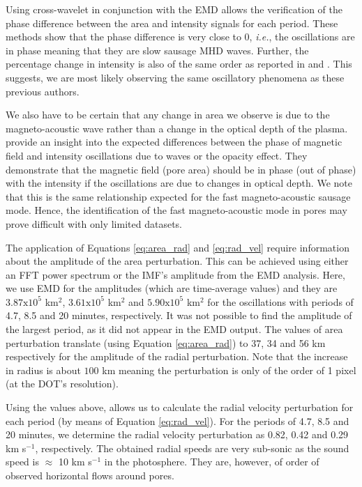     Using cross-wavelet in conjunction with the EMD allows the verification of the phase difference between the area and intensity signals for each period. 
    These methods show that the phase difference is very close to 0\degree, \textit{i.e.}, the oscillations are in phase meaning that they are slow sausage MHD waves.	
    Further, the percentage change in intensity is also of the same order as reported in \citet{Balthasar2000} and \citet{PMHDW}.
    This suggests, we are most likely observing the same oscillatory phenomena as these previous authors.
    
    We also have to be certain that any change in area we observe is due to the magneto-acoustic wave rather than a change in the optical depth of the plasma.
    \citet{PMHDW} provide an insight into the expected differences between the phase of magnetic field and intensity oscillations due to waves or the opacity effect.
    They demonstrate that the magnetic field (pore area) should be in phase (out of phase) with the intensity if the oscillations are due to changes in optical depth.
    We note that this is the same relationship expected for the fast magneto-acoustic sausage mode.
    Hence, the identification of the fast magneto-acoustic mode in pores may prove difficult with only limited datasets.
    
    The application of Equations \ref{eq:area_rad} and \ref{eq:rad_vel} require information about the amplitude of the area perturbation.
    This can be achieved using either an FFT power spectrum or the IMF's amplitude from the EMD analysis.
    Here, we use EMD for the amplitudes (which are time-average values) and they are $3.87\mathrm{x}10^5$ km$^2$, $3.61\mathrm{x}10^5$ km$^2$ and $5.90\mathrm{x}10^5$ km$^2$ for the oscillations with periods of 4.7, 8.5 and 20 minutes, respectively.
    It was not possible to find the amplitude of the largest period, as it did not appear in the EMD output.
    The values of area perturbation translate (using Equation \ref{eq:area_rad}) to 37, 34 and 56 km respectively for the amplitude of the radial perturbation.
    Note that the increase in radius is about $100$ km meaning the perturbation is only of the order of 1 pixel (at the DOT's resolution).
    
    Using the values above, allows us to calculate the radial velocity perturbation for each period (by means of Equation \ref{eq:rad_vel}).
    For the periods of 4.7, 8.5 and 20 minutes, we determine the radial velocity perturbation as 0.82, 0.42 and 0.29 km s$^{-1}$, respectively.
    The obtained radial speeds are very sub-sonic as the sound speed is $\approx$ 10 km s$^{-1}$ in the photosphere.
    They are, however, of order of observed horizontal flows around pores.
    
